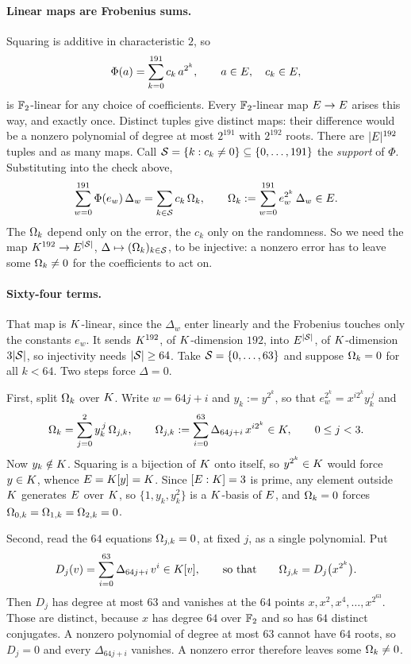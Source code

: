 \paragraph{Linear maps are Frobenius sums.} Squaring is additive in characteristic $2$, so
\[
\Phi(a)=\sum_{k=0}^{191}c_k\,a^{2^k},\qquad a\in E,\quad c_k\in E,
\]
is $\mathbb{F}_2$-linear for any choice of coefficients. Every $\mathbb{F}_2$-linear map $E\to E$ arises this way, and exactly once. Distinct tuples give distinct maps: their difference would be a nonzero polynomial of degree at most $2^{191}$ with $2^{192}$ roots. There are $|E|^{192}$ tuples and as many maps. Call $\mathcal{S}=\{k:c_k\neq0\}\subseteq\{0,\dots,191\}$ the \emph{support} of $\Phi$. Substituting into the check above,
\begin{equation}
\sum_{w=0}^{191}\Phi(e_w)\,\Delta_w=\sum_{k\in\mathcal{S}}c_k\,\Omega_k,
\qquad
\Omega_k:=\sum_{w=0}^{191}e_w^{2^k}\,\Delta_w\in E.
\label{eq:pairing}
\end{equation}
The $\Omega_k$ depend only on the error, the $c_k$ only on the randomness. So we need the map $K^{192}\to E^{|\mathcal{S}|}$, $\Delta\mapsto(\Omega_k)_{k\in\mathcal{S}}$, to be injective: a nonzero error has to leave some $\Omega_k\neq0$ for the coefficients to act on.

\paragraph{Sixty-four terms.} That map is $K$-linear, since the $\Delta_w$ enter linearly and the Frobenius touches only the constants $e_w$. It sends $K^{192}$, of $K$-dimension $192$, into $E^{|\mathcal{S}|}$, of $K$-dimension $3|\mathcal{S}|$, so injectivity needs $|\mathcal{S}|\ge64$. Take $\mathcal{S}=\{0,\dots,63\}$ and suppose $\Omega_k=0$ for all $k<64$. Two steps force $\Delta=0$.

First, split $\Omega_k$ over $K$. Write $w=64j+i$ and $y_k:=y^{2^k}$, so that $e_w^{2^k}=x^{i2^k}y_k^{\,j}$ and
\[
\Omega_k=\sum_{j=0}^{2}y_k^{\,j}\,\Omega_{j,k},
\qquad
\Omega_{j,k}:=\sum_{i=0}^{63}\Delta_{64j+i}\,x^{i2^k}\in K,\qquad 0\le j<3.
\]
Now $y_k\notin K$. Squaring is a bijection of $K$ onto itself, so $y^{2^k}\in K$ would force $y\in K$, whence $E=K[y]=K$. Since $[E:K]=3$ is prime, any element outside $K$ generates $E$ over $K$, so $\{1,y_k,y_k^2\}$ is a $K$-basis of $E$, and $\Omega_k=0$ forces $\Omega_{0,k}=\Omega_{1,k}=\Omega_{2,k}=0$.

Second, read the $64$ equations $\Omega_{j,k}=0$, at fixed $j$, as a single polynomial. Put
\[
D_j(v)=\sum_{i=0}^{63}\Delta_{64j+i}\,v^i\in K[v],
\qquad\text{so that}\qquad
\Omega_{j,k}=D_j\bigl(x^{2^k}\bigr).
\]
Then $D_j$ has degree at most $63$ and vanishes at the $64$ points $x,x^2,x^4,\dots,x^{2^{63}}$. Those are distinct, because $x$ has degree $64$ over $\mathbb{F}_2$ and so has $64$ distinct conjugates. A nonzero polynomial of degree at most $63$ cannot have $64$ roots, so $D_j=0$ and every $\Delta_{64j+i}$ vanishes. A nonzero error therefore leaves some $\Omega_k\neq0$.

